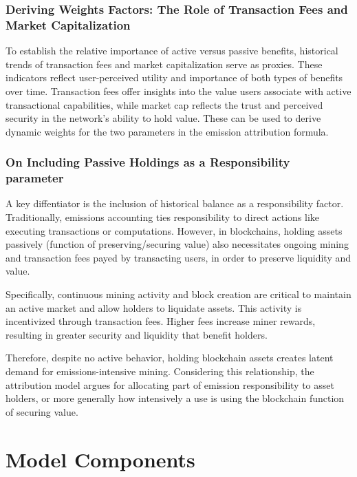 \documentclass[11pt]{report}
\begin{document}
\subsubsection*{Deriving Weights Factors: The Role of Transaction Fees and Market Capitalization}
To establish the relative importance of active versus passive benefits, historical trends of transaction fees and market capitalization serve as proxies. These indicators reflect user-perceived utility and importance of both types of benefits over time. Transaction fees offer insights into the value users associate with active transactional capabilities, while market cap reflects the trust and perceived security in the network's ability to hold value. These can be used to derive dynamic weights for the two parameters in the emission attribution formula.



\subsubsection*{On Including Passive Holdings as a Responsibility parameter}
A key diffentiator is the inclusion of historical balance as a responsibility factor. Traditionally, emissions accounting ties responsibility to direct actions like executing transactions or computations.  However, in blockchains, holding assets passively (function of preserving/securing value) also necessitates ongoing mining and transaction fees payed by transacting users, in order to preserve liquidity and value.


Specifically, continuous mining activity and block creation are critical to maintain an active market and allow holders to liquidate assets. This activity is incentivized through transaction fees. Higher fees increase miner rewards, resulting in greater security and liquidity that benefit holders.

Therefore, despite no active behavior, holding blockchain assets creates latent demand for emissions-intensive mining. Considering this relationship, the attribution model argues for allocating part of emission responsibility to asset holders, or more generally how intensively a use is using the blockchain function of securing value.

\section{Model Components}
\end{document}
